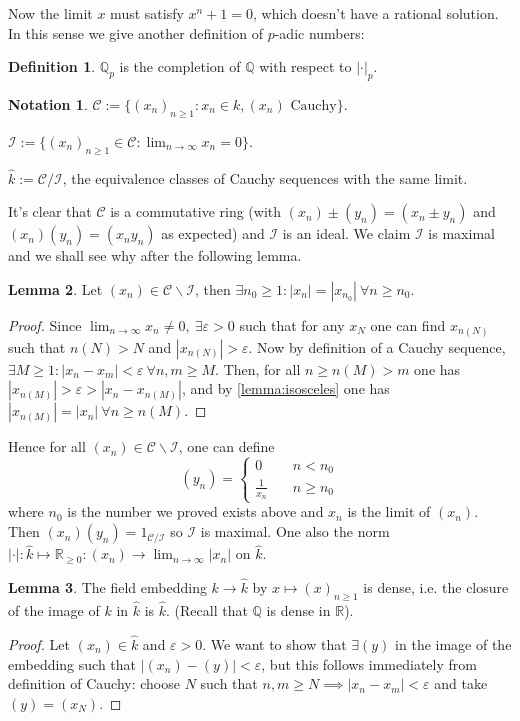 \documentclass{article}
\newcommand{\Q}{\mathbb{Q}}
\newcommand{\R}{\mathbb{R}}
\theoremstyle{definition}
\newtheorem{defn}{Definition}[subsection]
\newtheorem{lemma}[defn]{Lemma}
\newtheorem*{notation}{Notation}
\begin{document}
Now the limit $x$ must satisfy $x^n+1=0$, which doesn't have a rational solution. In this sense we give another definition of $p$-adic numbers:
\begin{defn}
$\Q_p$ is the completion of $\Q$ with respect to $|\cdot|_p$.
\end{defn}

\begin{notation}
$\mathcal C:=\{(x_n)_{n\geq 1}:x_n\in k,(x_n)\text{ Cauchy}\}$.

$\mathcal I:=\{(x_n)_{n\geq 1}\in\mathcal C:\lim_{n\rightarrow\infty} x_n=0\}$.

$\widehat k:=\mathcal C/\mathcal I$, the equivalence classes of Cauchy sequences with the same limit.

It's clear that $\mathcal C$ is a commutative ring (with $(x_n)\pm (y_n)=(x_n\pm y_n)$ and $(x_n)(y_n)=(x_ny_n)$ as expected) and $\mathcal I$ is an ideal. We claim $\mathcal I$ is maximal and we shall see why after the following lemma.
\end{notation}

\begin{lemma}
Let $(x_n)\in \mathcal C\backslash \mathcal I$, then $\exists n_0\geq 1: |x_n|=|x_{n_0}| \ \forall n\geq n_0$.
\end{lemma}

\begin{proof}
Since $\lim_{n\rightarrow\infty} x_n\neq 0,\ \exists \varepsilon>0$ such that for any $x_N$ one can find $x_{n(N)}$ such that $n(N)>N$ and $|x_{n(N)}|>\varepsilon$. Now by definition of a Cauchy sequence, $\exists M\geq 1:|x_n-x_m|<\varepsilon \ \forall n,m\geq M$. Then, for all $n\geq n(M)>m$ one has $|x_{n(M)}|>\varepsilon>|x_n-x_{n(M)}|$, and by \ref{lemma:isosceles} one has $|x_{n(M)}|=|x_n| \ \forall n\geq n(M)$.
\end{proof}

Hence for all $(x_n)\in\mathcal C\backslash\mathcal I$, one can define
\[
(y_n)=\left\{\begin{aligned}
0 &\quad n<n_0 \\
\frac{1}{x_n}&\quad n\geq n_0
\end{aligned} \right.
\]
where $n_0$ is the number we proved exists above and $x_n$ is the limit of $(x_n)$. Then $(x_n)(y_n)=1_{\mathcal C/\mathcal I}$ so $\mathcal I$ is maximal. One also the norm $|\cdot|:\widehat k\mapsto\R_{\geq 0}:(x_n)\rightarrow\lim_{n\rightarrow\infty}|x_n|$ on $\widehat k$.

\begin{lemma}
The field embedding $k\rightarrow\widehat k$ by $x\mapsto (x)_{n\geq 1}$ is dense, i.e. the closure of the image of $k$ in $\widehat k$ is $\widehat k$. (Recall that $\Q$ is dense in $\R$).
\end{lemma}
\begin{proof}
Let $(x_n)\in\widehat k$ and $\varepsilon>0$. We want to show that $\exists (y)$ in the image of the embedding such that $|(x_n)-(y)|<\varepsilon$, but this follows immediately from definition of Cauchy: choose $N$ such that $n,m\geq N\implies|x_n-x_m|<\varepsilon$ and take $(y)=(x_N)$.
\end{proof}
\end{document}
